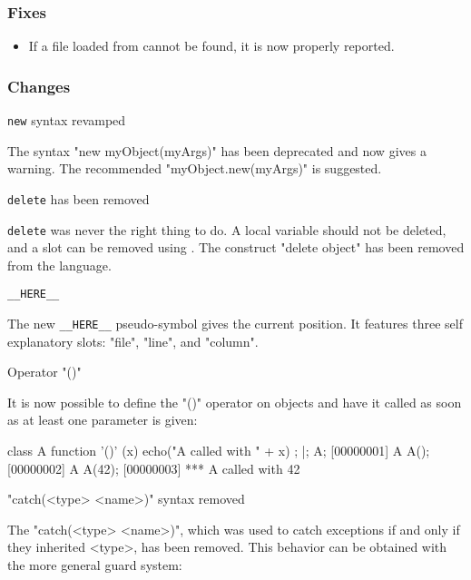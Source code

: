 \subsubsection{Fixes}

\begin{itemize}
\item If a file loaded from  cannot be found, it is now
  properly reported.
\end{itemize}


\subsubsection{Changes}

\begin{description}
\item \lstinline|new| syntax revamped

  The syntax "new myObject(myArgs)" has been deprecated and now gives a
  warning. The recommended "myObject.new(myArgs)" is suggested.

\item \lstinline|delete| has been removed

  \lstinline|delete| was never the right thing to do. A local variable
  should not be deleted, and a slot can be removed using
  .  The construct "delete object" has been
  removed from the language.

\item \lstinline|__HERE__|

  The new \lstinline|__HERE__| pseudo-symbol gives the current position.  It
  features three self explanatory slots: "file", "line", and "column".

\item Operator "()"

  It is now possible to define the "()" operator on objects and have it
  called as soon as at least one parameter is given:

\begin{urbiscript}
class A {
  function '()' (x) { echo("A called with " + x) };
}|;
A;
[00000001] A
A();
[00000002] A
A(42);
[00000003] *** A called with 42
\end{urbiscript}

\item "catch(<type> <name>)" syntax removed

  The "catch(<type> <name>)", which was used to catch exceptions if and only
  if they inherited <type>, has been removed. This behavior can be obtained
  with the more general guard system:


\end{description}

